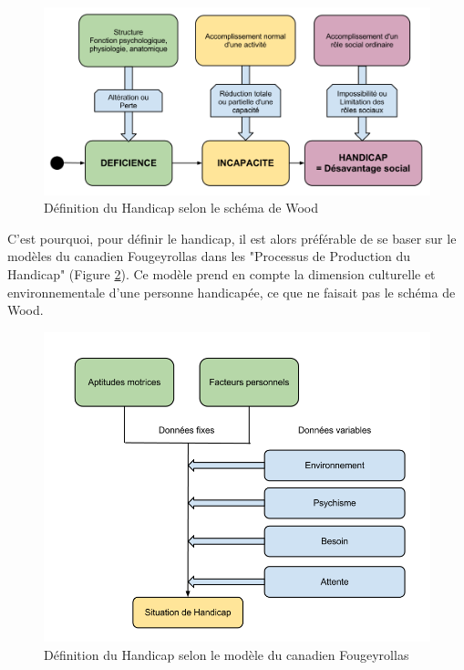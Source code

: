 \begin{figure}
\label{schema_wood}
\centering
\includegraphics[scale=0.45]{figures/schema_wood.png}
\caption{Définition du Handicap selon le schéma de Wood}
\end{figure}

C'est pourquoi, pour définir le handicap, il est alors préférable de se baser sur le modèles du canadien Fougeyrollas dans les "Processus de Production du Handicap" (Figure \ref{modele_canadien}). Ce modèle prend en compte la dimension culturelle et environnementale d'une personne handicapée, ce que ne faisait pas le schéma de Wood.

\begin{figure}[H]
\label{modele_canadien}
\centering
\includegraphics[scale=0.45]{figures/modele_canadien.png}
\caption{Définition du Handicap selon le modèle du canadien Fougeyrollas}
\end{figure}

